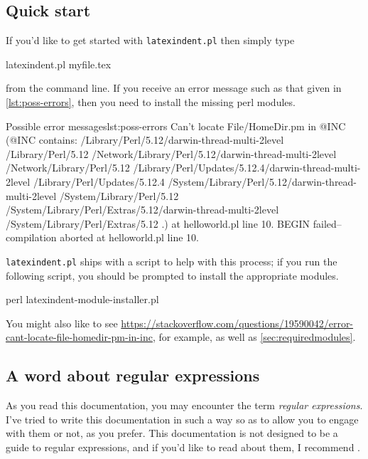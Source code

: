 \subsection{Quick start}\label{sec:quickstart}
	If you'd like to get started with \texttt{latexindent.pl} then simply type
	\begin{commandshell}
latexindent.pl myfile.tex
\end{commandshell}
	from the command line. If you receive an error message such as that given in
	\cref{lst:poss-errors}, then you need to install the missing perl modules.
	\begin{cmhlistings}[style=tcblatex,language=Perl]{Possible error messages}{lst:poss-errors}
Can't locate File/HomeDir.pm in @INC (@INC contains: /Library/Perl/5.12/darwin-thread-multi-2level /Library/Perl/5.12 /Network/Library/Perl/5.12/darwin-thread-multi-2level /Network/Library/Perl/5.12 /Library/Perl/Updates/5.12.4/darwin-thread-multi-2level /Library/Perl/Updates/5.12.4 /System/Library/Perl/5.12/darwin-thread-multi-2level /System/Library/Perl/5.12 /System/Library/Perl/Extras/5.12/darwin-thread-multi-2level /System/Library/Perl/Extras/5.12 .) at helloworld.pl line 10.
BEGIN failed--compilation aborted at helloworld.pl line 10.
\end{cmhlistings}
	\texttt{latexindent.pl} ships with a script to help with this process; if you run the
	following script, you should be prompted to install the appropriate modules.
	\begin{commandshell}
perl latexindent-module-installer.pl
\end{commandshell}
	You might also like to see \href{https://stackoverflow.com/questions/19590042/error-cant-locate-file-homedir-pm-in-inc}{https://stackoverflow.com/questions/19590042/error-cant-locate-file-homedir-pm-in-inc}, for example, as well as
	\vref{sec:requiredmodules}.

    \subsection{A word about regular expressions}
    As you read this documentation, you may encounter the term \emph{regular expressions}. 
    I've tried to write this documentation in such a way so as to allow you to engage with 
    them or not, as you prefer. This documentation is not designed to be a guide to regular 
    expressions, and if you'd like to read about them, I recommend \cite{masteringregexp}. 
